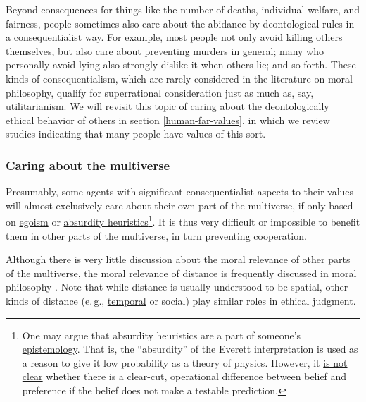 Beyond consequences for things like the number of deaths, individual
welfare, and fairness, people sometimes also care about the abidance by
deontological rules in a consequentialist way. For example, most people
not only avoid killing others themselves, but also care about preventing
murders in general; many who personally avoid lying also strongly
dislike it when others lie; and so forth. These kinds of
consequentialism, which are rarely considered in the literature on moral
philosophy, qualify for superrational consideration just as much as,
say,
\href{https://en.wikipedia.org/wiki/Utilitarianism}{utilitarianism}.
We will revisit this topic of caring about the deontologically ethical
behavior of others in section
\ref{human-far-values}, in
which we review studies indicating that many people have values of this
sort.

\hypertarget{caring-about-the-multiverse}{\subsubsection{Caring about
the multiverse}\label{caring-about-the-multiverse}}

Presumably, some agents with significant consequentialist aspects to
their values will almost exclusively care about their own part of the
multiverse, if only based on
\href{https://en.wikipedia.org/wiki/Ethical_egoism}{egoism} or
\href{https://wiki.lesswrong.com/wiki/Absurdity_heuristic}{absurdity
heuristics}\footnote{One may argue that absurdity heuristics are a part
  of someone's
  \href{https://en.wikipedia.org/wiki/Epistemology}{epistemology}.
  That is, the ``absurdity'' of the Everett interpretation is used as a
  reason to give it low probability as a theory of physics. However, it
  \href{http://reducing-suffering.org/why-does-physics-exist/\#My_new_understanding}{is
  not clear} whether there is a clear-cut, operational difference
  between belief and preference if the belief does not make a testable
  prediction.}. It is thus very difficult or impossible to benefit them
in other parts of the multiverse, in turn preventing cooperation.

Although there is very little discussion about the moral relevance of
other parts of the multiverse, the moral relevance of distance is
frequently discussed in moral philosophy
\parencite[see, e.\,g.,][]{Brock2013-cv}. Note that while distance is
usually understood to be spatial, other kinds of distance (e.\,g.,
\href{https://sentience-politics.org/philosophy/the-importance-of-the-future/}{temporal}
\parencite{Beckstead2013-lv} or social) play similar roles
in ethical judgment.

